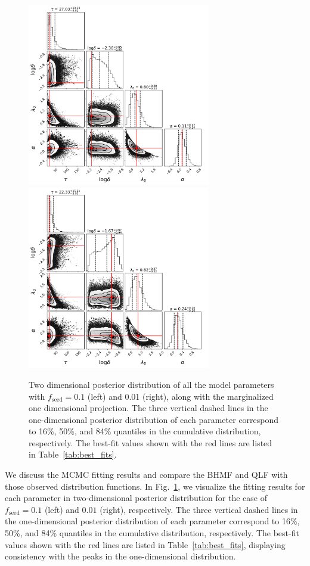 \documentclass[twocolumn, twocolappendix]{aastex63}
\newcommand{\fseed}{f_\mathrm{seed}}
\begin{document}
\begin{CJK*}{UTF8}{gbsn}
\begin{figure}
\centering
\includegraphics[width=80mm]{f1_corner.pdf}\hspace{3mm}
\includegraphics[width=80mm]{f2_corner.pdf}
\caption{
Two dimensional posterior distribution of all the model parameters with $\fseed=0.1$ (left) and 0.01 (right), 
along with the marginalized one dimensional projection.
The three vertical dashed lines in the one-dimensional posterior distribution of each parameter correspond to 
16\%, 50\%, and 84\% quantiles in the cumulative distribution, respectively. 
The best-fit values shown with the red lines are listed in Table~\ref{tab:best_fits}.
}
\label{fig:contour}
\vspace{5mm}
\end{figure}
%


We discuss the MCMC fitting results and compare the BHMF and QLF with those observed distribution functions.
In Fig.~\ref{fig:contour}, we visualize the fitting results for each parameter in two-dimensional 
posterior distribution for the case of $\fseed= 0.1$ (left) and $0.01$ (right), respectively.
The three vertical dashed lines in the one-dimensional posterior distribution of each parameter
correspond to 16\%, 50\%, and 84\% quantiles in the cumulative distribution, respectively.
The best-fit values shown with the red lines are listed in Table~\ref{tab:best_fits},
displaying consistency with the peaks in the one-dimensional distribution.



\end{CJK*}
\end{document}
